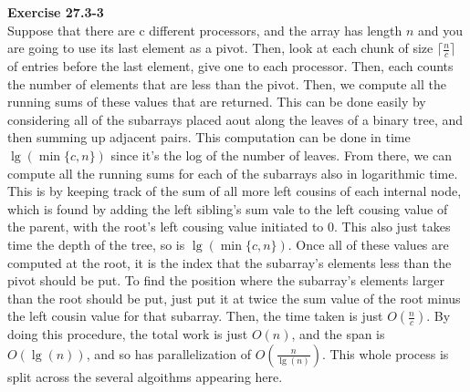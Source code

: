\documentclass{article}
\begin{document}
\noindent\textbf{Exercise 27.3-3}\\

Suppose that there are c different processors, and the array has length $n$ and you are going to use its last element as a pivot. Then, look at each chunk of size $\lceil\frac{n}{c}\rceil$ of entries before the last element, give one to each processor. Then, each counts the number of elements that are less than the pivot. Then, we compute all the running sums of these values that are returned. This can be done easily by considering all of the subarrays placed aout along the leaves of a binary tree, and then summing up adjacent pairs. This computation can be done in time $\lg(\min\{c,n\})$ since it's the log of the number of leaves. From there, we can compute all the running sums for each of the subarrays also in logarithmic time. This is by keeping track of the sum of all more left cousins of each internal node, which is found by adding the left sibling's sum vale to the left cousing value of the parent, with the root's left cousing value initiated to 0. This also just takes time the depth of the tree, so is $\lg(\min\{c,n\})$. Once all of these values are computed at the root, it is the index that the subarray's elements less than the pivot should be put. To find the position where the subarray's elements larger than the root should be put, just put it at twice the sum value of the root minus the left cousin value for that subarray. Then, the time taken is just $O(\frac{n}{c})$. By doing this procedure, the total work is just $O(n)$, and the span is $O(\lg(n))$, and so has parallelization of $O(\frac{n}{\lg(n)})$. This whole process is split across the several algoithms appearing here.\\
\end{document}
